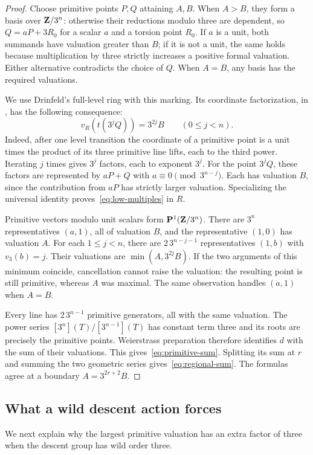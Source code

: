 \begin{proof}
Choose primitive points $P,Q$ attaining $A,B$. When $A>B$, they form a basis over $\mathbf Z/3^n$: otherwise their reductions modulo three are dependent, so $Q=aP+3R_0$ for a scalar $a$ and a torsion point $R_0$. If $a$ is a unit, both summands have valuation greater than $B$; if it is not a unit, the same holds because multiplication by three strictly increases a positive formal valuation. Either alternative contradicts the choice of $Q$. When $A=B$, any basis has the required valuations.

We use Drinfeld's full-level ring with this marking. Its coordinate factorization, in \citet[Proposition~2.2.3(vii), pp.~439--441]{CarterStrauch2021}, has the following consequence:
\begin{equation}\label{eq:low-multiples}
 v_R(t(3^jQ))=3^{2j}B\qquad(0\le j<n).
\end{equation}
Indeed, after one level transition the coordinate of a primitive point is a unit times the product of its three primitive line lifts, each to the third power. Iterating $j$ times gives $3^j$ factors, each to exponent $3^j$. For the point $3^jQ$, these factors are represented by $aP+Q$ with $a\equiv0\pmod{3^{n-j}}$. Each has valuation $B$, since the contribution from $aP$ has strictly larger valuation. Specializing the universal identity proves~\eqref{eq:low-multiples} in $R$.

Primitive vectors modulo unit scalars form $\mathbf P^1(\mathbf Z/3^n)$. There are $3^n$ representatives $(a,1)$, all of valuation $B$, and the representative $(1,0)$ has valuation $A$. For each $1\le j<n$, there are $2\,3^{n-j-1}$ representatives $(1,b)$ with $v_3(b)=j$. Their valuations are $\min(A,3^{2j}B)$. If the two arguments of this minimum coincide, cancellation cannot raise the valuation: the resulting point is still primitive, whereas $A$ was maximal. The same observation handles $(a,1)$ when $A=B$.

Every line has $2\,3^{n-1}$ primitive generators, all with the same valuation. The power series $[3^n](T)/[3^{n-1}](T)$ has constant term three and its roots are precisely the primitive points. Weierstrass preparation therefore identifies $d$ with the sum of their valuations. This gives~\eqref{eq:primitive-sum}. Splitting its sum at $r$ and summing the two geometric series gives~\eqref{eq:regional-sum}. The formulas agree at a boundary $A=3^{2r+2}B$.
\end{proof}

\subsection{What a wild descent action forces}
We next explain why the largest primitive valuation has an extra factor of three when the descent group has wild order three.

